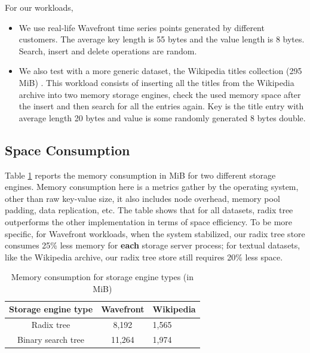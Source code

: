 \documentclass[sigplan,screen,nonacm]{acmart}
\begin{document}
For our workloads, 
\begin{itemize}
    \item We use real-life Wavefront time series points generated by different customers. The average key length is 55 bytes and the value length is 8 bytes. Search, insert and delete operations are random. 
    \item We also test with a more generic dataset, the Wikipedia titles collection (295 MiB) \cite{wikidatasets}. This workload consists of inserting all the titles from the Wikipedia archive into two memory storage engines, check the used memory space after the insert and then search for all the entries again. Key is the title entry with average length 20 bytes and value is some randomly generated 8 bytes double. 
\end{itemize}

\subsection{Space Consumption}
Table \ref{tab:memory-usage} reports the memory consumption in MiB for two different storage engines. Memory consumption here is a metrics gather by the operating system, other than raw key-value size, it also includes node overhead, memory pool padding, data replication, etc. The table shows that for all datasets, radix tree outperforms the other implementation in terms of space efficiency. To be more specific, for Wavefront workloads, when the system stabilized, our radix tree store consumes 25\% less memory for \textbf {each} storage server process; for textual datasets, like the Wikipedia archive, our radix tree store still requires 20\% less space. 
\begin{table}[h]
  \caption{Memory consumption for storage engine types (in MiB)}
  \begin{tabular}{ccl}
    \toprule
    Storage engine type&Wavefront&Wikipedia\\
    \midrule
    Radix tree & 8,192 & 1,565\\
    Binary search tree & 11,264 & 1,974\\
    \bottomrule
  \end{tabular}
  \label{tab:memory-usage}
\end{table}
\end{document}
